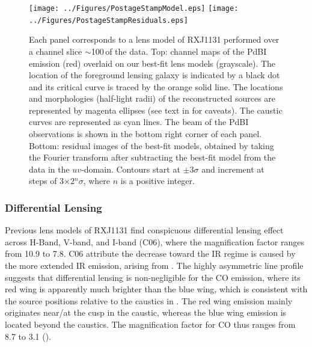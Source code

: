 \documentclass[]{emulateapj}
\begin{document}
\begin{figure}[tbph]
\centering
\texttt{[image: ../Figures/PostageStampModel.eps]}
\texttt{[image: ../Figures/PostageStampResiduals.eps]}
\caption{Each panel corresponds to a lens model of RXJ1131 performed over a
channel slice $\sim$100\,\kms of the \bco data. Top: channel maps of the
PdBI \bco emission (red) overlaid on our best-fit lens models (grayscale).
The location of the foreground lensing galaxy is indicated by a black dot and
its critical curve is traced by the orange solid line. The locations and
morphologies (half-light radii) of the reconstructed sources are
represented by magenta ellipses (see text in  for caveats).
The caustic curves are represented as cyan lines. The beam of the
PdBI observations is shown in the bottom right corner of each panel.
Bottom: residual images of the best-fit models, obtained by
taking the Fourier transform after subtracting the best-fit model from the
data in the $uv$-domain. Contours start
at $\pm$3$\sigma$ and increment at steps of 3$\times$2$^n\sigma$,
where $n$ is a positive integer.
\label{fig:model}}
\end{figure}

\subsubsection{Differential Lensing} \label{sec:differential} %
Previous lens models of RXJ1131 find conspicuous
differential lensing effect across H-Band, V-band, and I-band (C06), where the
magnification factor ranges from 10.9 to 7.8. C06 attribute
the decrease toward the IR regime is caused by the more extended
IR emission, arising from \SF.
The highly asymmetric \bco line profile suggests that
differential lensing is non-negligible for the CO emission, where its red wing
is apparently much brighter than the blue wing, which is consistent
with the source positions relative to the caustics in .
The red wing emission mainly originates near/at the cusp
in the caustic, whereas the blue wing emission is located beyond the caustics.
The magnification factor for CO thus ranges from 8.7 to 3.1 ().
\end{document}
